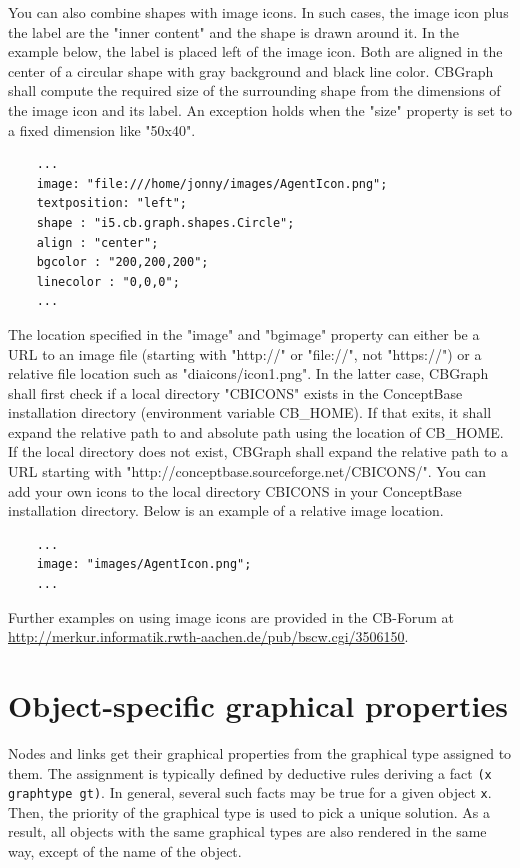 You can also combine shapes with image icons. In such cases, the image icon plus the
label are the "inner content" and the shape is drawn around it. In the example below,
the label is placed left of the image icon. Both are aligned in the center of a
circular shape with gray background and black line color. CBGraph shall compute the
required size of the surrounding shape from the dimensions of the image icon and its label. An exception
holds when the "size" property is set to a fixed dimension like "50x40".

{\small
\begin{verbatim}
    ...
    image: "file:///home/jonny/images/AgentIcon.png";
    textposition: "left";
    shape : "i5.cb.graph.shapes.Circle";
    align : "center";
    bgcolor : "200,200,200";
    linecolor : "0,0,0";
    ...
\end{verbatim}
}

The location specified in the "image" and "bgimage" property can either be a URL to an image file 
(starting with "http://" or "file://", not "https://") or a relative file location such as
"diaicons/icon1.png". In the latter case, CBGraph shall first check if a local
directory "CBICONS" exists in the ConceptBase installation directory (environment
variable CB\_HOME). If that exits, it shall expand the relative path to
and absolute path using the location of CB\_HOME.  If the local directory does
not exist, CBGraph shall expand the relative path to a URL starting with
"http://conceptbase.sourceforge.net/CBICONS/". 
You can add your own icons to the local directory CBICONS in your ConceptBase
installation directory. Below is an example of a relative image location.

{\small
\begin{verbatim}
    ...
    image: "images/AgentIcon.png";
    ...
\end{verbatim}
}


Further examples on using image icons are provided in the CB-Forum at
\url{http://merkur.informatik.rwth-aachen.de/pub/bscw.cgi/3506150}.


\section{Object-specific graphical properties}
\label{gproperty}

Nodes and links get their graphical properties from the graphical type assigned to them.
The assignment is typically defined by deductive rules deriving a fact {\tt (x graphtype gt)}. 
In general, several such facts may be true for a given object {\tt x}. Then, the priority
of the graphical type is used to pick a unique solution. As a result, all objects with
the same graphical types are also rendered in the same way, except of the name of the object.

